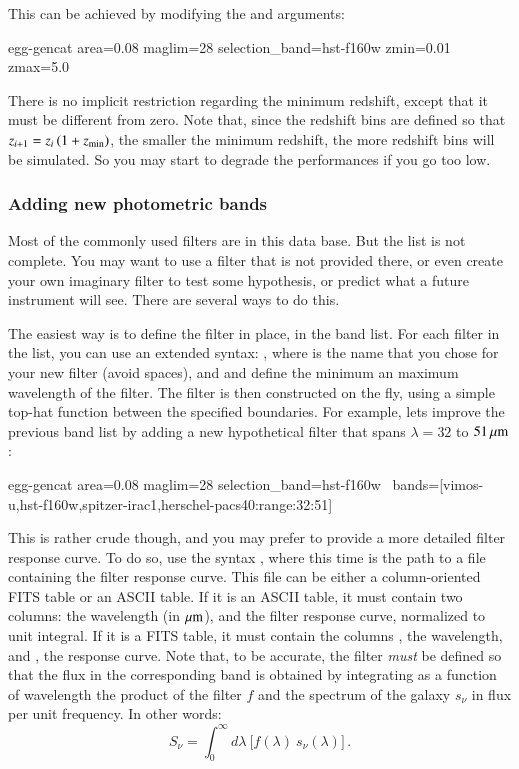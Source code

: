This can be achieved by modifying the  and  arguments:
\begin{bashcode}
egg-gencat area=0.08 maglim=28 selection_band=hst-f160w zmin=0.01 zmax=5.0
\end{bashcode}

There is no implicit restriction regarding the minimum redshift, except that it must be different from zero. Note that, since the redshift bins are defined so that $z_{i+1} = z_{i}\,(1 + z_{\rm min})$, the smaller the minimum redshift, the more redshift bins will be simulated. So you may start to degrade the performances if you go too low.


\subsubsection{Adding new photometric bands}

Most of the commonly used filters are in this data base. But the list is not complete. You may want to use a filter that is not provided there, or even create your own imaginary filter to test some hypothesis, or predict what a future instrument will see. There are several ways to do this.

The easiest way is to define the filter in place, in the band list. For each filter in the  list, you can use an extended syntax: , where  is the name that you chose for your new filter (avoid spaces), and \bashinline{[lmin]} and \bashinline{[lmax]} define the minimum an maximum wavelength of the filter. The filter is then constructed on the fly, using a simple top-hat function between the specified boundaries. For example, lets improve the previous band list by adding a new hypothetical filter  that spans $\lambda = 32$ to $51\,\mu{\rm m}$:
\begin{bashcode}
egg-gencat area=0.08 maglim=28 selection_band=hst-f160w \
    bands=[vimos-u,hst-f160w,spitzer-irac1,herschel-pacs40:range:32:51]
\end{bashcode}

This is rather crude though, and you may prefer to provide a more detailed filter response curve. To do so, use the syntax , where this time \bashinline{[path]} is the path to a file containing the filter response curve. This file can be either a column-oriented FITS table or an ASCII table. If it is an ASCII table, it must contain two columns: the wavelength (in $\mu{\rm m}$), and the filter response curve, normalized to unit integral. If it is a FITS table, it must contain the columns , the wavelength, and , the response curve. Note that, to be accurate, the filter \emph{must} be defined so that the flux in the corresponding band is obtained by integrating as a function of wavelength the product of the filter $f$ and the spectrum of the galaxy $s_\nu$ in flux per unit frequency. In other words:
\begin{equation}
    S_{\nu} = \int_0^{\infty} \!\!d\lambda\ \big[f(\lambda)\ s_\nu(\lambda)\big]\,. \nonumber
\end{equation}

